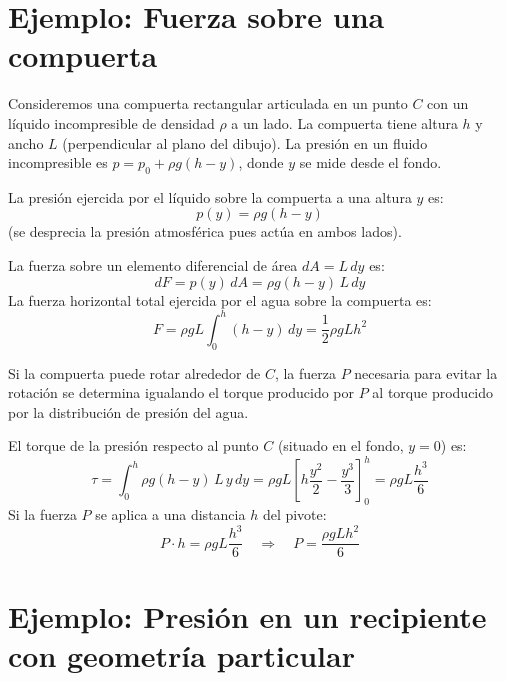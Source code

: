 \section{Ejemplo: Fuerza sobre una compuerta}

Consideremos una compuerta rectangular articulada en un punto $C$ con un líquido incompresible de densidad $\rho$ a un lado. La compuerta tiene altura $h$ y ancho $L$ (perpendicular al plano del dibujo). La presión en un fluido incompresible es $p = p_0 + \rho g(h - y)$, donde $y$ se mide desde el fondo.

La presión ejercida por el líquido sobre la compuerta a una altura $y$ es:
\begin{equation}
    p(y) = \rho g(h - y)
\end{equation}
(se desprecia la presión atmosférica pues actúa en ambos lados).

La fuerza sobre un elemento diferencial de área $dA = L\,dy$ es:
\begin{equation}
    dF = p(y)\,dA = \rho g(h-y)\,L\,dy
\end{equation}
La fuerza horizontal total ejercida por el agua sobre la compuerta es:
\begin{equation}
    F = \rho g L \int_0^h (h-y)\,dy = \frac{1}{2}\rho g L h^2
\end{equation}

Si la compuerta puede rotar alrededor de $C$, la fuerza $P$ necesaria para evitar la rotación se determina igualando el torque producido por $P$ al torque producido por la distribución de presión del agua.

El torque de la presión respecto al punto $C$ (situado en el fondo, $y = 0$) es:
\begin{equation}
    \tau = \int_0^h \rho g(h-y)\,L\,y\,dy = \rho g L\left[h\frac{y^2}{2} - \frac{y^3}{3}\right]_0^h = \rho g L\frac{h^3}{6}
\end{equation}
Si la fuerza $P$ se aplica a una distancia $h$ del pivote:
\begin{equation}
    P \cdot h = \rho g L \frac{h^3}{6} \quad \Longrightarrow \quad P = \frac{\rho g L h^2}{6}
\end{equation}

\section{Ejemplo: Presión en un recipiente con geometría particular}

